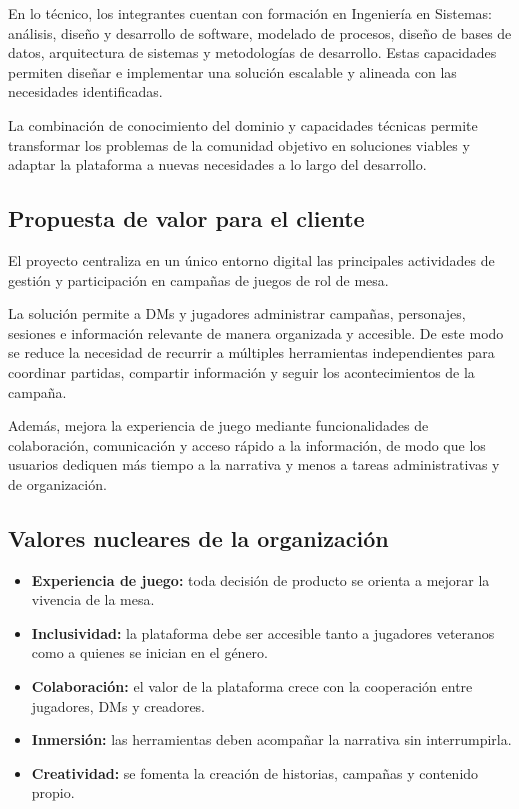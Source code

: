 En lo técnico, los integrantes cuentan con formación en Ingeniería en Sistemas: análisis, diseño y desarrollo de software, modelado de procesos, diseño de bases de datos, arquitectura de sistemas y metodologías de desarrollo. Estas capacidades permiten diseñar e implementar una solución escalable y alineada con las necesidades identificadas.

La combinación de conocimiento del dominio y capacidades técnicas permite transformar los problemas de la comunidad objetivo en soluciones viables y adaptar la plataforma a nuevas necesidades a lo largo del desarrollo.

\subsection{Propuesta de valor para el cliente}
El proyecto centraliza en un único entorno digital las principales actividades de gestión y participación en campañas de juegos de rol de mesa.

La solución permite a DMs y jugadores administrar campañas, personajes, sesiones e información relevante de manera organizada y accesible. De este modo se reduce la necesidad de recurrir a múltiples herramientas independientes para coordinar partidas, compartir información y seguir los acontecimientos de la campaña.

Además, mejora la experiencia de juego mediante funcionalidades de colaboración, comunicación y acceso rápido a la información, de modo que los usuarios dediquen más tiempo a la narrativa y menos a tareas administrativas y de organización.

\subsection{Valores nucleares de la organización}\label{sec:valores-nucleares}
\begin{itemize}
  \item \textbf{Experiencia de juego:} toda decisión de producto se orienta a mejorar la vivencia de la mesa.
  \item \textbf{Inclusividad:} la plataforma debe ser accesible tanto a jugadores veteranos como a quienes se inician en el género.
  \item \textbf{Colaboración:} el valor de la plataforma crece con la cooperación entre jugadores, DMs y creadores.
  \item \textbf{Inmersión:} las herramientas deben acompañar la narrativa sin interrumpirla.
  \item \textbf{Creatividad:} se fomenta la creación de historias, campañas y contenido propio.
\end{itemize}

